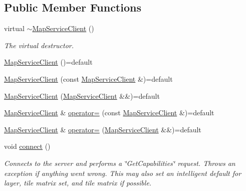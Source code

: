\subsection*{Public Member Functions}
\begin{DoxyCompactItemize}
\item 
virtual \hyperlink{group___imagery_module_ga93933812a2678d47a119231a41b52e2d}{$\sim$\+Map\+Service\+Client} ()
\begin{DoxyCompactList}\small\item\em The virtual destructor. \end{DoxyCompactList}\item 
\hyperlink{classdg_1_1deepcore_1_1imagery_1_1_map_service_client_a685520ebb2e38e682d692c7c31735ec8}{Map\+Service\+Client} ()=default
\item 
\hyperlink{classdg_1_1deepcore_1_1imagery_1_1_map_service_client_aa88eb99784963b56f0a72c28bdb471b6}{Map\+Service\+Client} (const \hyperlink{classdg_1_1deepcore_1_1imagery_1_1_map_service_client}{Map\+Service\+Client} \&)=default
\item 
\hyperlink{classdg_1_1deepcore_1_1imagery_1_1_map_service_client_aaecb8f29beadd0543e2588e8d876a79e}{Map\+Service\+Client} (\hyperlink{classdg_1_1deepcore_1_1imagery_1_1_map_service_client}{Map\+Service\+Client} \&\&)=default
\item 
\hyperlink{classdg_1_1deepcore_1_1imagery_1_1_map_service_client}{Map\+Service\+Client} \& \hyperlink{classdg_1_1deepcore_1_1imagery_1_1_map_service_client_a3a0d5a1aa4134bfa8899dff7a7912035}{operator=} (const \hyperlink{classdg_1_1deepcore_1_1imagery_1_1_map_service_client}{Map\+Service\+Client} \&)=default
\item 
\hyperlink{classdg_1_1deepcore_1_1imagery_1_1_map_service_client}{Map\+Service\+Client} \& \hyperlink{classdg_1_1deepcore_1_1imagery_1_1_map_service_client_a44f4f7f40a9e1e3b31c8fae058bb3447}{operator=} (\hyperlink{classdg_1_1deepcore_1_1imagery_1_1_map_service_client}{Map\+Service\+Client} \&\&)=default
\item 
void \hyperlink{group___imagery_module_ga5e5f58c725cafba7966936f688a6ade0}{connect} ()
\begin{DoxyCompactList}\small\item\em Connects to the server and performs a \char`\"{}\+Get\+Capabilities\char`\"{} request. Throws an exception if anything went wrong. This may also set an intelligent default for layer, tile matrix set, and tile matrix if possible. \end{DoxyCompactList}\item 

\end{DoxyCompactItemize}
